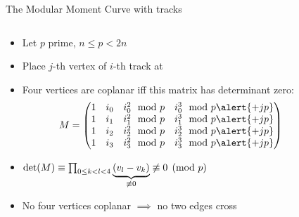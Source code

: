 \documentclass[t]{beamer}
\begin{document}
\begin{frame}{The Modular Moment Curve with tracks}
    \vspace{-0.5cm}
    \begin{columns}
	\begin{column}{0.5\textwidth}
		\begin{itemize}
		    \item <+-> Let $p$ prime, $n\le p<2n$
		    \item
			Place $j$-th vertex of $i$-th track at  \\
		    \item Four vertices are coplanar iff this matrix has determinant zero:
			\begin{equation*}
			    M = \begin{pmatrix}
				{1}&i_0&i_0^2\mod p&i_0^3\mod p \alert{+jp}\\
				{1}&i_1&i_1^2\mod p&i_1^3\mod p \alert{+jp}\\
				{1}&i_2&i_2^2\mod p&i_2^3\mod p \alert{+jp}\\
				{1}&i_3&i_3^2\mod p&i_3^3\mod p \alert{+jp}\\
			    \end{pmatrix}
			\end{equation*}
		    \item 
			\(\det(M) \equiv \prod_{0 \le k < l < 4} \underbrace{(v_l - v_k)}_{\not\equiv 0} \not\equiv\mathrlap{0 \pmod p}\)
		    \item No four vertices coplanar \linebreak $\implies$ no two edges cross
		\end{itemize}
	\end{column}
	    \begin{column}{0.5\textwidth}
		\begin{center}
		\end{center}
	    \end{column}
    \end{columns}
\end{frame}
\end{document}
